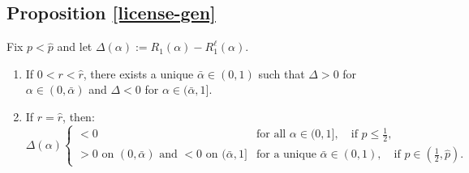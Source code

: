 \subsection*{Proposition \ref{license-gen}}

\begin{lem}\label{lem:license-boundary}
Fix $p < \hat{p}$ and let $\Delta(\alpha) := R_1(\alpha) - R_1^\ell(\alpha)$.
\begin{enumerate}
    \item If $0 < r < \hat{r}$, there exists a unique $\bar{\alpha} \in (0,1)$ such that $\Delta > 0$ for $\alpha \in (0,\bar{\alpha})$ and $\Delta < 0$ for $\alpha \in (\bar{\alpha},1]$.
    \item If $r = \hat{r}$, then:
    \begin{equation*}
        \Delta(\alpha) \begin{cases}
            < 0 & \text{for all } \alpha \in (0,1], \quad \text{if } p \leq \frac{1}{2}, \\[5pt]
            > 0 \text{ on } (0,\bar{\alpha}) \text{ and } < 0 \text{ on } (\bar{\alpha},1] & \text{for a unique } \bar{\alpha} \in (0,1), \quad \text{if } p \in \left(\frac{1}{2}, \hat{p}\right).
        \end{cases}
    \end{equation*}
\end{enumerate}
\end{lem}

